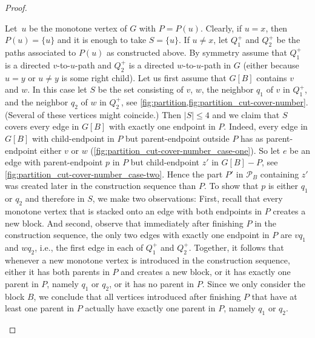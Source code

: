 \documentclass{article}
\newcommand{\calP}{\ensuremath{\mathcal{P}}\xspace}
\begin{document}
\begin{proof}
\begin{subproof}
    Let~$u$ be the monotone vertex of $G$ with $P = P(u)$.
    Clearly, if $u=x$, then $P(u) = \{u\}$ and it is enough to take $S = \{u\}$.
    If $u \neq x$, let $Q_1^+$ and $Q_2^+$ be the paths associated to $P(u)$ as constructed above.
    By symmetry assume that $Q_1^+$ is a directed $v$-to-$u$-path and $Q_2^+$ is a directed $w$-to-$u$-path in $G$ (either because $u=y$ or $u \neq y$ is some right child).
    Let us first assume that $G[B]$ contains $v$ and $w$.
    In this case let $S$ be the set consisting of $v$, $w$, the neighbor $ q_1 $ of $v$ in $Q_1^+$, and the neighbor $ q_2 $ of $w$ in $Q_2^+$, see \cref{fig:partition,fig:partition_cut-cover-number}.
    (Several of these vertices might coincide.)
    Then $|S| \leq 4$ and we claim that $S$ covers every edge in $G[B]$ with exactly one endpoint in $P$.
    Indeed, every edge in $G[B]$ with child-endpoint in $P$ but parent-endpoint outside $ P $ has as parent-endpoint either $v$ or $w$ (\cref{fig:partition_cut-cover-number_case-one}).
    So let $e$ be an edge with parent-endpoint $ p $ in $P$ but child-endpoint $z'$ in $G[B] - P$, see \cref{fig:partition_cut-cover-number_case-two}.
    Hence the part $P'$ in $\calP_B$ containing $z'$ was created later in the construction sequence than $P$.
    To show that $ p $ is either $ q_1 $ or $ q_2 $ and therefore in $ S $, we make two observations:
    First, recall that every monotone vertex that is stacked onto an edge with both endpoints in $ P $ creates a new block.
    And second, observe that immediately after finishing $ P $ in the construction sequence, the only two edges with exactly one endpoint in $ P $ are $ v q_1 $ and $ w q_2 $, i.e., the first edge in each of $ Q_1^+ $ and $ Q_2^+ $.
    Together, it follows that whenever a new monotone vertex is introduced in the construction sequence, either it has both parents in $ P $ and creates a new block, or it has exactly one parent in $ P $, namely $ q_1 $ or $ q_2 $, or it has no parent in $ P $.
    Since we only consider the block $ B $, we conclude that all vertices introduced after finishing $ P $ that have at least one parent in $ P $ actually have exactly one parent in $ P $, namely $ q_1 $ or $ q_2 $.


\end{subproof}
\end{proof}
\end{document}
